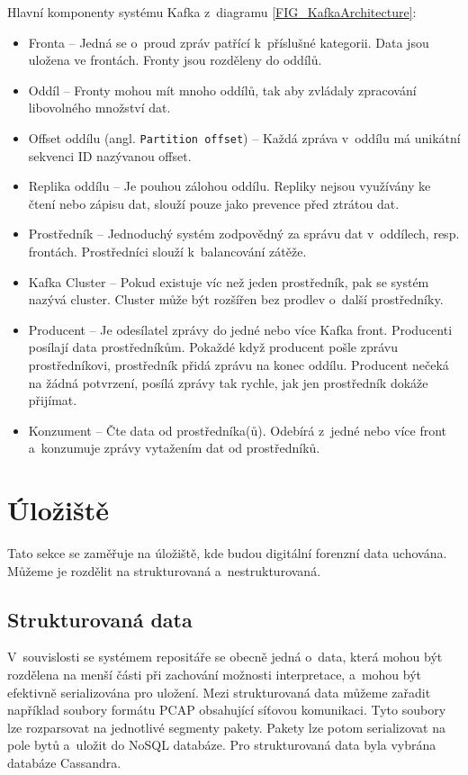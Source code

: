 \vspace{0.5cm}
\noindent Hlavní komponenty systému Kafka z~diagramu \ref{FIG_KafkaArchitecture}:
\begin{itemize}
    \item Fronta -- Jedná se o~proud zpráv patřící k~příslušné kategorii. Data jsou uložena ve frontách. Fronty jsou rozděleny do oddílů.
    
    \item Oddíl -- Fronty mohou mít mnoho oddílů, tak aby zvládaly zpracování libovolného množství dat.

    \item Offset oddílu (angl. \texttt{Partition offset}) -- Každá zpráva v~oddílu má unikátní sekvenci ID nazývanou offset.

    \item Replika oddílu -- Je pouhou zálohou oddílu. Repliky nejsou využívány ke čtení nebo zápisu dat, slouží pouze jako prevence před ztrátou dat.
    
    \item Prostředník -- Jednoduchý systém zodpovědný za správu dat v~oddílech, resp. frontách. Prostředníci slouží k~balancování zátěže.
    
    \item Kafka Cluster -- Pokud existuje víc než jeden prostředník, pak se systém nazývá cluster. Cluster může být rozšířen bez prodlev o~další prostředníky.
    
    \item Producent -- Je odesílatel zprávy do jedné nebo více Kafka front. Producenti posílají data prostředníkům. Pokaždé když producent pošle zprávu prostředníkovi, prostředník přidá zprávu na konec oddílu. Producent nečeká na žádná potvrzení, posílá zprávy tak rychle, jak jen prostředník dokáže přijímat.
    
    \item Konzument -- Čte data od prostředníka(ů). Odebírá z~jedné nebo více front a~konzumuje zprávy vytažením dat od prostředníků.
\end{itemize}

\section{Úložiště}
Tato sekce se zaměřuje na úložiště, kde budou digitální forenzní data uchována. Můžeme je rozdělit na strukturovaná a~nestrukturovaná.

\subsection{Strukturovaná data}
V~souvislosti se systémem repositáře se obecně jedná o~data, která mohou být rozdělena na menší části při zachování možnosti interpretace, a~mohou být efektivně serializována pro uložení. Mezi strukturovaná data můžeme zařadit například soubory formátu PCAP obsahující síťovou komunikaci. Tyto soubory lze rozparsovat na jednotlivé segmenty pakety. Pakety lze potom serializovat na pole bytů a~uložit do NoSQL databáze. Pro strukturovaná data byla vybrána databáze Cassandra.

